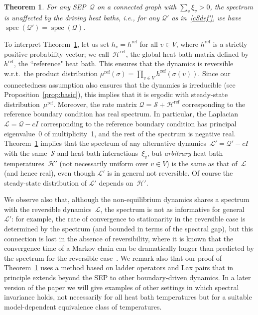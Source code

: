 \documentclass[11pt]{article}
\theoremstyle{plain}
\newtheorem{theorem}{Theorem}%
\theoremstyle{definition}
\theoremstyle{remark}
\numberwithin{equation}{section}
\newcommand{\cH}{{\mathcal H}}
\newcommand{\cL}{{\mathcal L}}
\newcommand{\cS}{{\mathcal S}}
\DeclareMathOperator{\spec}{spec}
\renewcommand{\cS}{{\mathcal Q}}
\newcommand{\cSin}{{\mathcal S}}
\newcommand{\hrf}{h^{\text{ref}}}
\newcommand{\Hrf}{\cH^{\text{ref}}}
\newcommand{\murf}{\mu^{\text{ref}}}
\begin{document}
\begin{theorem} \label{septhm}
For any SEP~$\cS$ on a connected graph with $\sum_v\xi_v>0$, 
the spectrum is unaffected by the driving heat baths, 
i.e., for any $\cS'$ as in~\eqref{cSdef'}, we have $\spec(\cS')=\spec(\cS)$. 
\end{theorem}

To interpret Theorem~\ref{septhm}, let us set $h_v = \hrf$ for all $v\in V$,
where $\hrf$ is a strictly positive probability vector; we call~$\Hrf$, the global heat bath matrix
defined by $\hrf$, the ``reference" heat bath.  This ensures that the dynamics is reversible w.r.t.\ 
the product distribution $\murf(\sigma)=\prod_{v\in V}\hrf(\sigma(v))$.
Since our connectedness assumption also ensures that the dynamics is irreducible (see
Proposition~\ref{prop:basic}), this implies that it is ergodic with steady-state distribution~$\murf$. 
Moreover, the rate matrix $\cS=\cSin+\Hrf$ corresponding to the reference boundary
condition has real spectrum. 
 In particular, the Laplacian $\cL=\cS - cI$ 
corresponding to the reference boundary condition has principal eigenvalue~0 of multiplicity~1,
and the rest of the spectrum is negative real.  Theorem~\ref{septhm} implies that the spectrum
of any alternative dynamics~$\cL'=\cS'-cI$ with the same~$\cSin$ and heat bath interactions~$\xi_v$,
but \emph{arbitrary} heat bath temperatures~$\cH'$ 
(not necessarily uniform over $v\in V$) is the same as that of~$\cL$ (and hence real), even though $\cL'$ is
in general not reversible. Of course the steady-state distribution of $\cL'$ depends on~$\cH'$.
 

We observe also that, although the non-equilibrium dynamics shares a spectrum with the 
reversible dynamics~$\cL$, the spectrum is not as informative for general~$\cL'$: for example, 
the rate of convergence to stationarity in the reversible case is determined
by the spectrum (and bounded in terms of the spectral gap), but this
connection is lost in the absence of reversibility, where it is known that the convergence time of a Markov chain can be dramatically
longer than predicted by the spectrum for the reversible case~\cite{MehtaS20}.
We remark also that our proof of Theorem~\ref{septhm} uses a method based on ladder operators and Lax pairs
that in principle extends beyond the SEP to other boundary-driven dynamics.  In a later version of the
paper we will give examples of other settings in which spectral invariance holds, not necessarily for 
all heat bath temperatures but for a suitable model-dependent equivalence class of temperatures.
\end{document}
